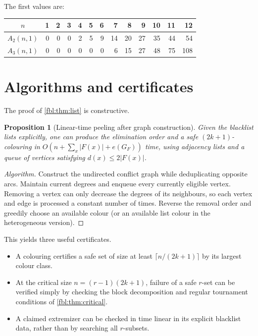 \documentclass[11pt]{article}
\newtheorem{proposition}[theorem]{Proposition}
\theoremstyle{definition}
\theoremstyle{remark}
\begin{document}
The first values are:
\begin{center}
\begin{tabular}{c|rrrrrrrrrrrr}
$n$&1&2&3&4&5&6&7&8&9&10&11&12\\ \hline
$A_2(n,1)$&0&0&0&2&5&9&14&20&27&35&44&54\\
$A_3(n,1)$&0&0&0&0&0&0&6&15&27&48&75&108
\end{tabular}
\end{center}

\section{Algorithms and certificates}\label{fbl:sec:algorithms}

The proof of \cref{fbl:thm:list} is constructive.

\begin{proposition}[Linear-time peeling after graph construction]
\label{fbl:prop:algorithm}
Given the blacklist lists explicitly, one can produce the elimination order
and a safe $(2k+1)$-colouring in
$O(n+\sum_x|F(x)|+e(G_F))$ time, using adjacency lists and a queue of
vertices satisfying $d(x)\le2|F(x)|$.
\end{proposition}

\begin{proof}[Algorithm]
Construct the undirected conflict graph while deduplicating opposite arcs.
Maintain current degrees and enqueue every currently eligible vertex.
Removing a vertex can only decrease the degrees of its neighbours, so each
vertex and edge is processed a constant number of times.  Reverse the
removal order and greedily choose an available colour (or an available list
colour in the heterogeneous version).
\end{proof}

This yields three useful certificates.
\begin{itemize}
\item A colouring certifies a safe set of size at least
$\lceil n/(2k+1)\rceil$ by its largest colour class.
\item At the critical size $n=(r-1)(2k+1)$, failure of a safe $r$-set can be
verified simply by checking the block decomposition and regular tournament
conditions of \cref{fbl:thm:critical}.
\item A claimed extremizer can be checked in time linear in its explicit
blacklist data, rather than by searching all $r$-subsets.
\end{itemize}
\end{document}

